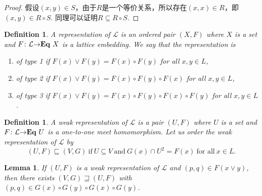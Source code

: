 \documentclass{article}
\newtheorem{lemma}[theorem]{Lemma}
\newtheorem{definition}[theorem]{Definition}
\newcommand*{\xfunc}[4]{{#2}\colon{#3}{#1}{#4}}
\newcommand*{\func}[3]{\xfunc{\to}{#1}{#2}{#3}}
\newcommand\lattice{\mathcal{L}}
\newcommand\eql[1]{\ensuremath\mathbf{Eq}~{#1}}
\begin{document}
\begin{proof}
假设$(x, y) \in S$，由于$R$是一个等价关系，所以存在$(x,x) \in R$，即$(x, y) \in R \circ S$. 同理可以证明$R \subseteq R \circ S$. 
\end{proof}

\begin{definition}
\rm A representation of $\lattice$ is an ordered pair $(X,F)$ where $X$ is a set and $\func{F}{\lattice}{\eql{X}}$ is a lattice embedding. We say that the representation is 
\begin{enumerate}
	\item of {\color{red} type 1} if $F(x) \vee F(y) = F(x) \circ F(y)$ for all $x,y \in L$,
	\item of {\color{red} type 2} if $F(x) \vee F(y) = F(x) \circ F(y) \circ F(x)$ for all $x,y \in L$,
	\item of {\color{red} type 3} if $F(x) \vee F(y) = F(x) \circ F(y) \circ F(x) \circ F(y)$ for all $x,y \in L$.
\end{enumerate}
\end{definition}

\begin{definition}
\rm A {\color{red} weak representation} of $\lattice$ is a pair $(U,F)$ where $U$ is a set and $\func{F}{\lattice}{\eql{U}}$ is a one-to-one meet homomorphism. Let us order the weak representation of $\lattice$ by
$$
(U,F) \sqsubseteq (V,G)~\text{if}~U \subseteq V~\text{and}~G(x) \cap U^2 = F(x)~\text{for all}~x \in L.
$$
\end{definition}

\begin{lemma}
\rm If $(U,F)$ is a weak representation of $\lattice$ and $(p,q) \in F(x \vee y)$, then there exists $(V,G) \sqsupseteq (U,F)$  with $(p,q) \in G(x)\circ G(y) \circ G(x) \circ G(y)$.
\end{lemma}
\end{document}
